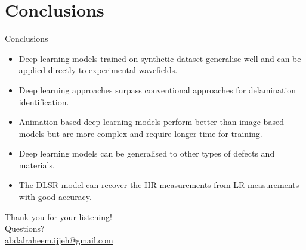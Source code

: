 \documentclass[10pt,aspectratio=169,dvipsnames]{beamer} %
\begin{document}
\section{Conclusions}
\begin{frame}{Conclusions}		
	\begin{footnotesize}
		\begin{justify}
			\addtolength{\leftmargini}{\labelsep}
			\begin{itemize}
				\item{Deep learning models trained on synthetic dataset generalise well and can be applied directly to experimental wavefields.}			
				\item{Deep learning approaches surpass conventional approaches for delamination identification.}	
				\item{Animation-based deep learning models perform better than image-based models but are more complex and require longer time for training.}					
				\item{Deep learning models can be generalised to other types of defects and materials.}
				\item{The DLSR model can recover the HR measurements from LR measurements with good accuracy.}
			\end{itemize}
		\end{justify}									
	\end{footnotesize}			
\end{frame}			
\note{}	
\setcounter{subfigure}{0}
{
	\begin{frame}[standout]
		\centering
		Thank you for your listening!\\ \vspace{12pt}
		Questions?\\ \vspace{12pt}
		\url{abdalraheem.ijjeh@gmail.com}
	\end{frame}
}
\note{}	
\end{document}
